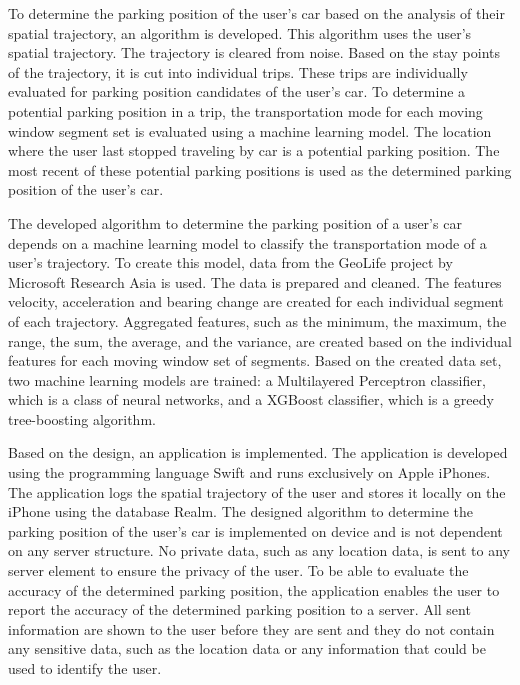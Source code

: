 To determine the parking position of the user's car based on the analysis of their spatial trajectory, an algorithm is developed. This algorithm uses the user's spatial trajectory. The trajectory is cleared from noise. Based on the stay points of the trajectory, it is cut into individual trips. These trips are individually evaluated for parking position candidates of the user's car. To determine a potential parking position in a trip, the transportation mode for each moving window segment set is evaluated using a machine learning model. The location where the user last stopped traveling by car is a potential parking position. The most recent of these potential parking positions is used as the determined parking position of the user's car. 

The developed algorithm to determine the parking position of a user's car depends on a machine learning model to classify the transportation mode of a user's trajectory. To create this model, data from the GeoLife project by Microsoft Research Asia is used. The data is prepared and cleaned. The features velocity, acceleration and bearing change are created for each individual segment of each trajectory. Aggregated features, such as the minimum, the maximum, the range, the sum, the average, and the variance, are created based on the individual features for each moving window set of segments. Based on the created data set, two machine learning models are trained: a Multilayered Perceptron classifier, which is a class of neural networks, and a XGBoost classifier, which is a greedy tree-boosting algorithm. 

Based on the design, an application is implemented. The application is developed using the programming language Swift and runs exclusively on Apple iPhones. The application logs the spatial trajectory of the user and stores it locally on the iPhone using the database Realm. The designed algorithm to determine the parking position of the user's car is implemented on device and is not dependent on any server structure. No private data, such as any location data, is sent to any server element to ensure the privacy of the user. To be able to evaluate the accuracy of the determined parking position, the application enables the user to report the accuracy of the determined parking position to a server. All sent information are shown to the user before they are sent and they do not contain any sensitive data, such as the location data or any information that could be used to identify the user. 

